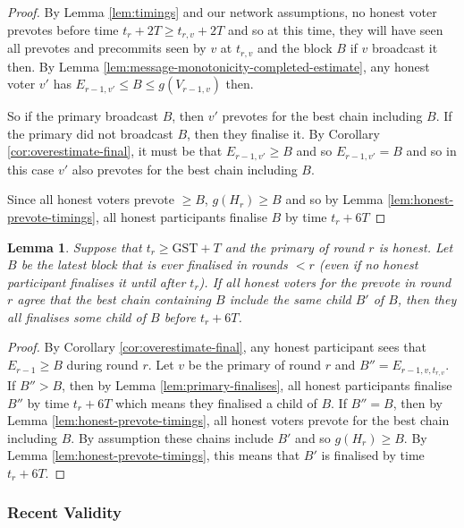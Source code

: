 \documentclass{article}
\newtheorem{lemma}[theorem]{Lemma}
\def\GST{\mathrm{GST}}
\begin{document}
\begin{proof} By Lemma \ref{lem:timings} and our network assumptions, no honest voter  prevotes before time $t_r+2T \geq t_{r,v}+2T$ and so at this time, they will have seen all prevotes and precommits seen by $v$ at $t_{r,v}$ and the block $B$ if $v$ broadcast it then. By Lemma \ref{lem:message-monotonicity-completed-estimate}, any honest voter $v'$ has $E_{r-1,v'} \leq B \leq g(V_{r-1,v})$ then.

So if the primary broadcast $B$, then $v'$ prevotes for the best chain including $B$. If the primary did not broadcast $B$, then they finalise it. By Corollary \ref{cor:overestimate-final}, it must be that $E_{r-1,v'} \geq B$ and so $E_{r-1,v'}=B$ and so in this case $v'$ also prevotes for the best chain including $B$.

Since all honest voters prevote $\geq B$, $g(H_r) \geq B$ and so by Lemma \ref{lem:honest-prevote-timings}, all honest participants finalise $B$ by time $t_r+6T$
\end{proof}



\begin{lemma}
 Suppose that $t_r \geq \GST+T$ and the primary of round $r$ is honest. 
Let $B$ be the latest block that is ever finalised in rounds  $<r$ (even if no honest participant finalises it until after $t_r$). If all honest voters for the prevote in round $r$ agree that the best chain containing $B$ include the same child $B'$ of $B$, then they all finalises some child of $B$ before $t_r+6T$.
\end{lemma}

\begin{proof} By Corollary \ref{cor:overestimate-final}, any honest participant sees that $E_{r-1} \geq B$ during round $r$. Let $v$ be the primary of round $r$ and $B''=E_{r-1,v,t_{r,v}}$. If $B'' > B$, then by Lemma \ref{lem:primary-finalises}, all honest participants finalise $B''$ by time $t_r+6T$ which means they finalised a child of $B$. If $B''=B$, then by Lemma \ref{lem:honest-prevote-timings}, all honest voters prevote for the best chain including $B$.
By assumption these chains include $B'$ and so $g(H_r) \geq B$. By Lemma \ref{lem:honest-prevote-timings}, this means that $B'$ is finalised by time $t_r+6T$.
\end{proof}







\subsubsection{Recent Validity}
\end{document}
